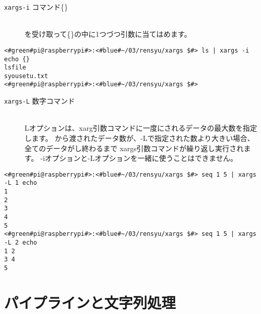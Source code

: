 \begin{description}
    \item[\texttt{xargs}\textvisiblespace \texttt{-i}\textvisiblespace
                コマンド\textvisiblespace \{\}]\mbox{}\\
    を受け取って\{\}の中に1つづつ引数に当てはめます。
\end{description}

\begin{lstlisting}[caption=xargsコマンドのオプションi]
<#green#pi@raspberrypi#>:<#blue#~/03/rensyu/xargs $#> ls | xargs -i echo {}
lsfile
syousetu.txt
<#green#pi@raspberrypi#>:<#blue#~/03/rensyu/xargs $#>
\end{lstlisting}

\begin{description}
    \item[\texttt{xargs}\textvisiblespace \texttt{-L}\textvisiblespace
                数字\textvisiblespace コマンド]\mbox{}\\
    Lオプションは、xarg引数コマンドに一度にされるデータの最大数を指定します。
    から渡されたデータ数が、-Lで指定された数より大きい場合、全てのデータがし終わるまで
    xargs引数コマンドが繰り返し実行されます。
    -iオプションと-Lオプションを一緒に使うことはできません。
\end{description}

\begin{lstlisting}[caption=xargsコマンドのオプションL]
<#green#pi@raspberrypi#>:<#blue#~/03/rensyu/xargs $#> seq 1 5 | xargs -L 1 echo
1
2
3
4
5
<#green#pi@raspberrypi#>:<#blue#~/03/rensyu/xargs $#> seq 1 5 | xargs -L 2 echo
1 2
3 4
5
\end{lstlisting}

\begin{tcolorbox}[title=\useOmetoi]
    \begin{enumerate}
    \end{enumerate}
\end{tcolorbox}

\section{パイプラインと文字列処理}

